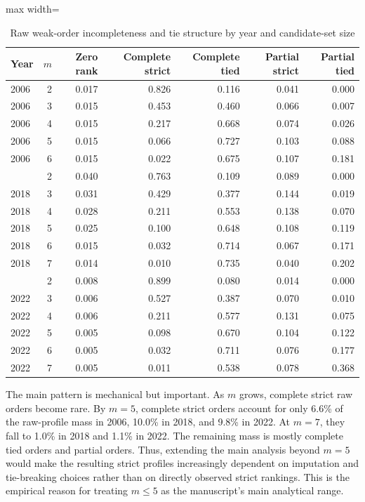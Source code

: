\documentclass[12pt]{article}
\begin{document}
\begin{table}[htbp]
\centering
\footnotesize
\caption{Raw weak-order incompleteness and tie structure by year and candidate-set size}
\label{tab:raw-order-incompleteness-compact}
\begin{adjustbox}{max width=\textwidth}
\begin{tabular}{lrrrrrr}
\toprule
Year & \(m\) & Zero rank & Complete strict & Complete tied & Partial strict & Partial tied \\
\midrule
2006 & 2 & 0.017 & 0.826 & 0.116 & 0.041 & 0.000 \\
2006 & 3 & 0.015 & 0.453 & 0.460 & 0.066 & 0.007 \\
2006 & 4 & 0.015 & 0.217 & 0.668 & 0.074 & 0.026 \\
2006 & 5 & 0.015 & 0.066 & 0.727 & 0.103 & 0.088 \\
2006 & 6 & 0.015 & 0.022 & 0.675 & 0.107 & 0.181 \\
\addlinespace
2018 & 2 & 0.040 & 0.763 & 0.109 & 0.089 & 0.000 \\
2018 & 3 & 0.031 & 0.429 & 0.377 & 0.144 & 0.019 \\
2018 & 4 & 0.028 & 0.211 & 0.553 & 0.138 & 0.070 \\
2018 & 5 & 0.025 & 0.100 & 0.648 & 0.108 & 0.119 \\
2018 & 6 & 0.015 & 0.032 & 0.714 & 0.067 & 0.171 \\
2018 & 7 & 0.014 & 0.010 & 0.735 & 0.040 & 0.202 \\
\addlinespace
2022 & 2 & 0.008 & 0.899 & 0.080 & 0.014 & 0.000 \\
2022 & 3 & 0.006 & 0.527 & 0.387 & 0.070 & 0.010 \\
2022 & 4 & 0.006 & 0.211 & 0.577 & 0.131 & 0.075 \\
2022 & 5 & 0.005 & 0.098 & 0.670 & 0.104 & 0.122 \\
2022 & 6 & 0.005 & 0.032 & 0.711 & 0.076 & 0.177 \\
2022 & 7 & 0.005 & 0.011 & 0.538 & 0.078 & 0.368 \\
\bottomrule
\end{tabular}
\end{adjustbox}
\end{table}

The main pattern is mechanical but important. As \(m\) grows, complete strict
raw orders become rare. By \(m=5\), complete strict orders account for only
6.6\% of the raw-profile mass in 2006, 10.0\% in 2018, and 9.8\% in 2022. At
\(m=7\), they fall to 1.0\% in 2018 and 1.1\% in 2022. The remaining mass is
mostly complete tied orders and partial orders. Thus, extending the main
analysis beyond \(m=5\) would make the resulting strict profiles increasingly
dependent on imputation and tie-breaking choices rather than on directly
observed strict rankings. This is the empirical reason for treating \(m\leq 5\)
as the manuscript's main analytical range.
\end{document}
